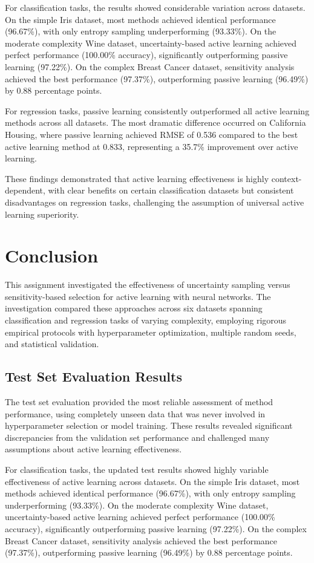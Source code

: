 \documentclass[conference]{IEEEtran}
\begin{document}
For classification tasks, the results showed considerable variation across datasets. On the simple Iris dataset, most methods achieved identical performance (96.67\%), with only entropy sampling underperforming (93.33\%). On the moderate complexity Wine dataset, uncertainty-based active learning achieved perfect performance (100.00\% accuracy), significantly outperforming passive learning (97.22\%). On the complex Breast Cancer dataset, sensitivity analysis achieved the best performance (97.37\%), outperforming passive learning (96.49\%) by 0.88 percentage points.

For regression tasks, passive learning consistently outperformed all active learning methods across all datasets. The most dramatic difference occurred on California Housing, where passive learning achieved RMSE of 0.536 compared to the best active learning method at 0.833, representing a 35.7\% improvement over active learning.

These findings demonstrated that active learning effectiveness is highly context-dependent, with clear benefits on certain classification datasets but consistent disadvantages on regression tasks, challenging the assumption of universal active learning superiority.

\section{Conclusion}

This assignment investigated the effectiveness of uncertainty sampling versus sensitivity-based selection for active learning with neural networks. The investigation compared these approaches across six datasets spanning classification and regression tasks of varying complexity, employing rigorous empirical protocols with hyperparameter optimization, multiple random seeds, and statistical validation.

\subsection{Test Set Evaluation Results}

The test set evaluation provided the most reliable assessment of method performance, using completely unseen data that was never involved in hyperparameter selection or model training. These results revealed significant discrepancies from the validation set performance and challenged many assumptions about active learning effectiveness.

For classification tasks, the updated test results showed highly variable effectiveness of active learning across datasets. On the simple Iris dataset, most methods achieved identical performance (96.67\%), with only entropy sampling underperforming (93.33\%). On the moderate complexity Wine dataset, uncertainty-based active learning achieved perfect performance (100.00\% accuracy), significantly outperforming passive learning (97.22\%). On the complex Breast Cancer dataset, sensitivity analysis achieved the best performance (97.37\%), outperforming passive learning (96.49\%) by 0.88 percentage points.
\end{document}
